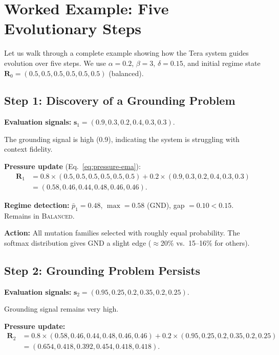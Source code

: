 \section{Worked Example: Five Evolutionary Steps}
\label{sec:tera-worked-example}

Let us walk through a complete example showing how the Tera system guides evolution over five steps. We use $\alpha = 0.2$, $\beta = 3$, $\delta = 0.15$, and initial regime state $\mathbf{R}_0 = (0.5, 0.5, 0.5, 0.5, 0.5, 0.5)$ (balanced).

\subsection{Step 1: Discovery of a Grounding Problem}

\textbf{Evaluation signals:} $\mathbf{s}_1 = (0.9, 0.3, 0.2, 0.4, 0.3, 0.3)$.

The grounding signal is high (0.9), indicating the system is struggling with context fidelity.

\textbf{Pressure update} (Eq.~\ref{eq:pressure-ema}):
\[
\begin{aligned}
\mathbf{R}_1
&= 0.8 \times (0.5, 0.5, 0.5, 0.5, 0.5, 0.5) + 0.2 \times (0.9, 0.3, 0.2, 0.4, 0.3, 0.3) \\
&= (0.58, 0.46, 0.44, 0.48, 0.46, 0.46).
\end{aligned}
\]

\textbf{Regime detection:} $\bar{p}_1 = 0.48$, $\max = 0.58$ (GND), gap $= 0.10 < 0.15$. Remains in \textsc{Balanced}.

\textbf{Action:} All mutation families selected with roughly equal probability. The softmax distribution gives GND a slight edge ($\approx$20\% vs.\ 15--16\% for others).

\subsection{Step 2: Grounding Problem Persists}

\textbf{Evaluation signals:} $\mathbf{s}_2 = (0.95, 0.25, 0.2, 0.35, 0.2, 0.25)$.

Grounding signal remains very high.

\textbf{Pressure update:}
\[
\begin{aligned}
\mathbf{R}_2
&= 0.8 \times (0.58, 0.46, 0.44, 0.48, 0.46, 0.46) + 0.2 \times (0.95, 0.25, 0.2, 0.35, 0.2, 0.25) \\
&= (0.654, 0.418, 0.392, 0.454, 0.418, 0.418).
\end{aligned}
\]

